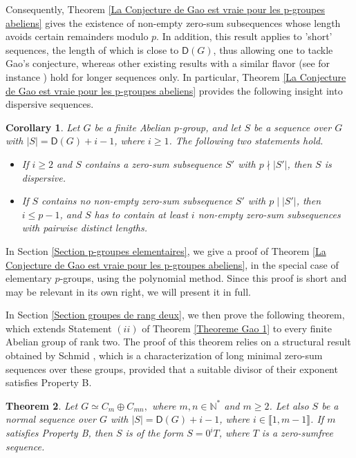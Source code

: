 \documentclass[english,12pt,a4paper,twoside]{smfart}
\theoremstyle{plain}
\newtheorem{theorem}{Theorem}[section]
\newtheorem{corollary}[theorem]{Corollary}
\theoremstyle{definition}
\theoremstyle{remark}
\begin{document}
Consequently, Theorem \ref{La Conjecture de Gao est vraie pour les p-groupes abeliens} gives the existence of non-empty zero-sum subsequences whose length avoids certain remainders modulo $p$. In addition, this result applies to 'short' sequences, the length of which is close to $\mathsf{D}(G)$, thus allowing one to tackle Gao's conjecture, whereas other existing results with a similar flavor (see for instance \cite[Theorem $1.2$]{Schmid01}) hold for longer sequences only. In particular, Theorem \ref{La Conjecture de Gao est vraie pour les p-groupes abeliens} provides the following insight into dispersive sequences.  

\begin{corollary}
\label{Theorem on dispersive sequences}
Let $G$ be a finite Abelian $p$-group, and let $S$ be a sequence over $G$ with $\left|S\right| = \mathsf{D}(G)+i-1$, where $i \geq 1$. The following two statements hold.

\begin{itemize}
\item[$(i)$] If $i \geq 2$ and $S$ contains a zero-sum subsequence $S'$ with $p \nmid\left|S'\right|$, then $S$ is dispersive. 
\item[$(ii)$] If $S$ contains no non-empty zero-sum subsequence $S'$ with $p \mid \left|S'\right|$, then $i \leq p-1$, and $S$ has to contain at least $i$ non-empty zero-sum subsequences with pairwise distinct lengths.
\end{itemize} 
\end{corollary}

In Section \ref{Section p-groupes elementaires}, we give a proof of Theorem \ref{La Conjecture de Gao est vraie pour les p-groupes abeliens}, in the special case of elementary $p$-groups, using the polynomial method. 
Since this proof is short and may be relevant in its own right, we will present it in full. 

\medskip
In Section \ref{Section groupes de rang deux}, we then prove the following theorem, which extends Statement $(ii)$ of Theorem \ref{Theoreme Gao 1} to every finite Abelian group of rank two. The proof of this theorem relies on a structural result obtained by Schmid \cite{Wolfgang}, which is a characterization of long minimal zero-sum sequences over these groups, provided that a suitable divisor of their exponent satisfies Property B. 

\begin{theorem}\label{Groupes de rang deux} Let $G \simeq C_{m} \oplus C_{mn},$ where $m,n \in \mathbb{N}^*$ and $m \geq 2$. Let also $S$ be a normal sequence over $G$ with $\left|S\right|=\mathsf{D}(G)+i-1$, where $i \in \llbracket 1,m-1 \rrbracket$. If $m$ satisfies Property B, then $S$ is of the form $S=0^iT$, where $T$ is a zero-sumfree sequence.  
\end{theorem}
\end{document}
